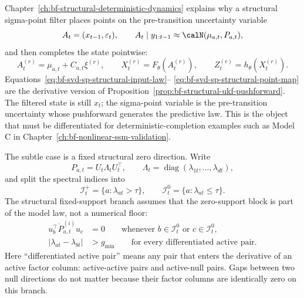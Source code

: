 Chapter~\ref{ch:bf-structural-deterministic-dynamics} explains why a
structural sigma-point filter places points on the pre-transition uncertainty
variable
\begin{equation}
\label{eq:bf-svd-sp-structural-input-law}
  A_t=(x_{t-1},\varepsilon_t),
  \qquad
  A_t\mid y_{1:t-1}\approx\calN(\mu_{a,t},P_{a,t}),
\end{equation}
and then completes the state pointwise:
\begin{equation}
\label{eq:bf-svd-sp-structural-point-map}
  A_t^{(r)}=\mu_{a,t}+C_{a,t}\xi^{(r)},\qquad
  X_t^{(r)}=F_\theta(A_t^{(r)}),\qquad
  Z_t^{(r)}=h_\theta(X_t^{(r)}).
\end{equation}
Equations~\eqref{eq:bf-svd-sp-structural-input-law}--%
\eqref{eq:bf-svd-sp-structural-point-map} are the derivative version of
Proposition~\ref{prop:bf-structural-ukf-pushforward}.  The filtered state is
still $x_t$; the sigma-point variable is the pre-transition uncertainty whose
pushforward generates the predictive law.  This is the object that must be
differentiated for deterministic-completion examples such as Model C in
Chapter~\ref{ch:bf-nonlinear-ssm-validation}.

The subtle case is a fixed structural zero direction.  Write
\[
  P_{a,t}=U_t\Lambda_tU_t^\top,\qquad
  \Lambda_t=\operatorname{diag}(\lambda_{1t},\ldots,\lambda_{dt}),
\]
and split the spectral indices into
\[
  \mathcal I_t^+=\{a:\lambda_{at}>\tau\},\qquad
  \mathcal I_t^0=\{a:\lambda_{at}\le \tau\}.
\]
The structural fixed-support branch assumes that the zero-support block is
part of the model law, not a numerical floor:
\begin{align}
\label{eq:bf-svd-sp-fixed-support-null-conditions}
  u_b^\top \dot P_{a,t}^{(i)}u_c &=0
  \qquad
  \text{whenever } b\in\mathcal I_t^0
  \text{ or } c\in\mathcal I_t^0,\\
\label{eq:bf-svd-sp-fixed-support-gap-condition}
  |\lambda_{at}-\lambda_{bt}| &> g_{\min}
  \qquad
  \text{for every differentiated active pair.}
\end{align}
Here ``differentiated active pair'' means any pair that enters the derivative
of an active factor column: active-active pairs and active-null pairs.  Gaps
between two null directions do not matter because their factor columns are
identically zero on this branch.

